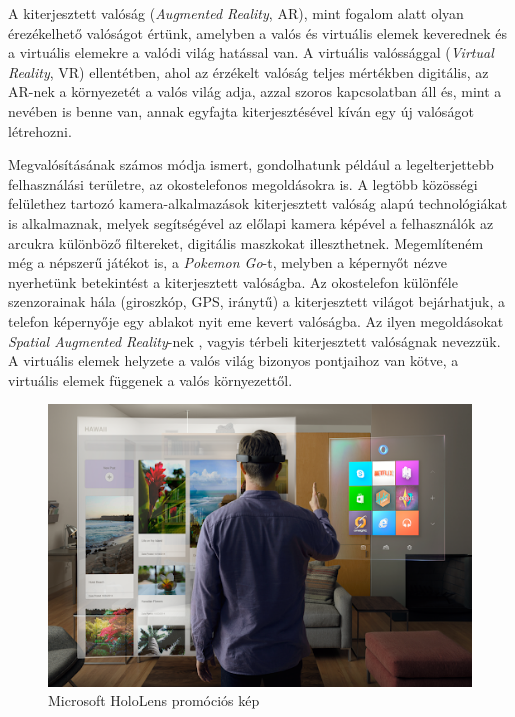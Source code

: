 


A kiterjesztett valóság (\textit{Augmented Reality}, AR), mint fogalom alatt olyan érezékelhető valóságot értünk, amelyben a valós és virtuális elemek keverednek és a virtuális elemekre a valódi világ hatással van. A virtuális valóssággal (\textit{Virtual Reality}, VR) ellentétben, ahol az érzékelt valóság teljes mértékben digitális, az AR-nek a környezetét a valós világ adja, azzal szoros kapcsolatban áll és, mint a nevében is benne van, annak egyfajta kiterjesztésével kíván egy új valóságot létrehozni.

Megvalósításának számos módja ismert, gondolhatunk például a legelterjettebb felhasználási területre, az okostelefonos megoldásokra is. A legtöbb közösségi felülethez tartozó kamera-alkalmazások kiterjesztett valóság alapú technológiákat is alkalmaznak, melyek segítségével az előlapi kamera képével a felhasználók az arcukra különböző filtereket, digitális maszkokat illeszthetnek. Megemlíteném még a népszerű játékot is, a \textit{Pokemon Go}-t, melyben a képernyőt nézve nyerhetünk betekintést a kiterjesztett valóságba. Az okostelefon különféle szenzorainak hála (giroszkóp, GPS, iránytű) a kiterjesztett világot bejárhatjuk, a telefon képernyője egy ablakot nyit eme kevert valóságba. Az ilyen megoldásokat \textit{Spatial Augmented Reality}-nek \cite{bimber2005spatial}, vagyis térbeli kiterjesztett valóságnak nevezzük. A virtuális elemek helyzete a valós világ bizonyos pontjaihoz van kötve, a virtuális elemek függenek a valós környezettől.

\begin{figure}[h]
\centering
\includegraphics[width=10.3truecm, height=6.28truecm]{images/AR-hololens.png}
\caption{Microsoft HoloLens promóciós kép}
\label{fig:hololens}
\end{figure}

